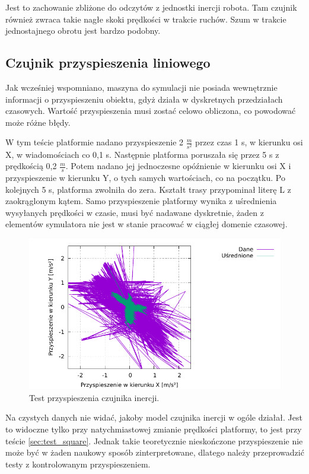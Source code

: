 		Jest to zachowanie zbliżone do odczytów z jednostki inercji robota. Tam czujnik również zwraca takie nagłe skoki prędkości w trakcie ruchów.
		Szum w trakcie jednostajnego obrotu jest bardzo podobny.
		
	\subsection{Czujnik przyspieszenia liniowego}
		Jak wcześniej wspomniano, maszyna do symulacji nie posiada wewnętrznie informacji o przyspieszeniu obiektu, gdyż działa w dyskretnych przedziałach czasowych.
		Wartość przyspieszenia musi zostać celowo obliczona, co powodować może różne błędy.
		
		W tym teście platformie nadano przyspieszenie 2 $\frac{m}{s^2}$ przez czas 1 s, w kierunku osi X, w wiadomościach co 0,1 s.
		Następnie platforma poruszała się przez 5 s z prędkością 0,2 $\frac{m}{s}$.
		Potem nadano jej jednoczesne opóźnienie w kierunku osi X i przyspieszenie w kierunku Y, o tych samych wartościach, co na początku.
		Po kolejnych 5 s, platforma zwolniła do zera. Kształt trasy przypominał literę L z zaokrąglonym kątem.
		Samo przyspieszenie platformy wynika z uśrednienia wysyłanych prędkości w czasie, musi być nadawane dyskretnie, żaden z elementów symulatora nie jest w stanie
		pracować w ciągłej domenie czasowej.
		
		\begin{figure}[H]
		\centering
			\includegraphics[width=\textwidth]{plots/wewucho_linear.pdf}
			\caption{Test przyspieszenia czujnika inercji.}
			\label{plot:wewucho_angular}
		\end{figure}
		
		Na czystych danych nie widać, jakoby model czujnika inercji w ogóle działał. 
		Jest to widoczne tylko przy natychmiastowej zmianie prędkości platformy, to jest przy teście \ref{sec:test_square}.
		Jednak takie teoretycznie nieskończone przyspieszenie nie może być w żaden naukowy sposób zinterpretowane, dlatego należy przeprowadzić testy z kontrolowanym
		przyspieszeniem.
		
